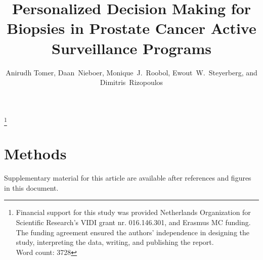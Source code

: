 \documentclass[Review,sagev,times]{sagej}
\begin{document}

\title{Personalized Decision Making for Biopsies in Prostate Cancer Active Surveillance Programs}

\author{Anirudh Tomer, Daan~Nieboer, Monique~J.~Roobol, Ewout~W.~Steyerberg, and Dimitris~Rizopoulos}







\maketitle

\footnote{Financial support for this study was provided Netherlands Organization for Scientific Research's VIDI grant nr. 016.146.301, and Erasmus MC funding. The funding agreement ensured the authors’ independence in designing the study, interpreting the data, writing, and publishing the report.\\Word count: 3728}
\thefootnote



\section{Methods}
\label{sec:methods}











\begin{sm}
Supplementary material for this article are available after references and figures in this document.
\end{sm} 



\end{document}
